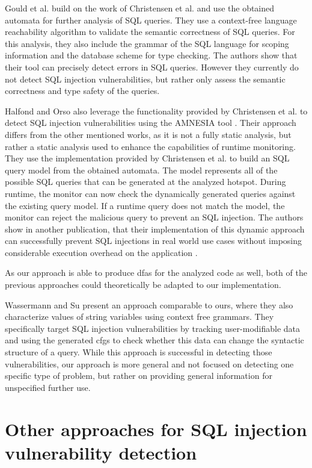 Gould et al. \cite{gould2004static} build on the work of Christensen et al. and use the obtained automata for further analysis of SQL queries. They use a context-free language reachability algorithm to validate the semantic correctness of SQL queries. For this analysis, they also include the grammar of the SQL language for scoping information and the database scheme for type checking.
The authors show that their tool can precisely detect errors in SQL queries. However they currently do not detect SQL injection vulnerabilities, but rather only assess the semantic correctness and type safety of the queries.

Halfond and Orso also leverage the functionality provided by Christensen et al. to detect SQL injection vulnerabilities using the AMNESIA tool \cite{amnesia}. Their approach differs from the other mentioned works, as it is not a fully static analysis, but rather a static analysis used to enhance the capabilities of runtime monitoring. They use the implementation provided by Christensen et al. to build an SQL query model from the obtained automata. The model represents all of the possible SQL queries that can be generated at the analyzed hotspot.
During runtime, the monitor can now check the dynamically generated queries against the existing query model. If a runtime query does not match the model, the monitor can reject the malicious query to prevent an SQL injection. The authors show in another publication, that their implementation of this dynamic approach can successfully prevent SQL injections in real world use cases without imposing considerable execution overhead on the application \cite{amnesia_evaluation}.

As our approach is able to produce \acp{dfa} for the analyzed code as well, both of the previous approaches could theoretically be adapted to our implementation.

Wassermann and Su \cite{sqli_wassermann_su} present an approach comparable to ours, where they also characterize values of string variables using context free grammars. They specifically target SQL injection vulnerabilities by tracking user-modifiable data and using the generated \acp{cfg} to check whether this data can change the syntactic structure of a query. While this approach is successful in detecting those vulnerabilities, our approach is more general and not focused on detecting one specific type of problem, but rather on providing general information for unspecified further use.

\section{Other approaches for SQL injection vulnerability detection}


